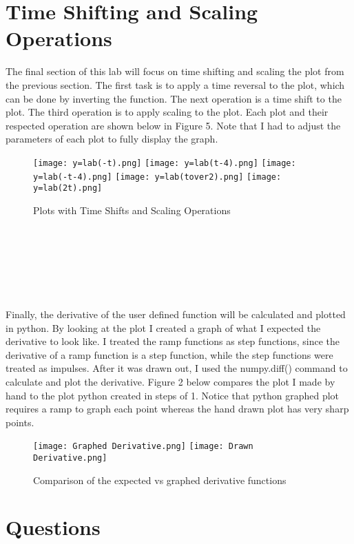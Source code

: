 \documentclass[footheight=20pt, footsepline, headhight=20pt, headsepline]{scrartcl}
\begin{document}
\section{Time Shifting and Scaling Operations}
\hspace{\parindent}The final section of this lab will focus on time shifting and scaling the plot from the previous section. The first task is to apply a time reversal to the plot, which can be done by inverting the function. The next operation is a time shift to the plot. The third operation is to apply scaling to the plot. Each plot and their respected operation are shown below in Figure 5. Note that I had to adjust the parameters of each plot to fully display the graph.
\begin{figure}[h!]
    \texttt{[image: y=lab(-t).png]}
    \texttt{[image: y=lab(t-4).png]}
    \texttt{[image: y=lab(-t-4).png]}
    \texttt{[image: y=lab(tover2).png]}
    \centering
    \texttt{[image: y=lab(2t).png]}
    \caption{Plots with Time Shifts and Scaling Operations}
    \label{Figure 5:}
\end{figure}
\\\\\\\\\\\\
\hspace{\parindent}Finally, the derivative of the user defined function will be calculated and plotted in python. By looking at the plot I created a graph of what I expected the derivative to look like. I treated the ramp functions as step functions, since the derivative of a ramp function is a step function, while the step functions were treated as impulses. After it was drawn out, I used the numpy.diff() command to calculate and plot the derivative. Figure 2 below compares the plot I made by hand to the plot python created in steps of 1. Notice that python graphed plot requires a ramp to graph each point whereas the hand drawn plot has very sharp points.
\begin{figure}[h!]
    \centering
    \texttt{[image: Graphed Derivative.png]}
    \texttt{[image: Drawn Derivative.png]}
    \caption{Comparison of the expected vs graphed derivative functions}
    \label{Figure 6:}
\end{figure}
\section{Questions}
\end{document}
